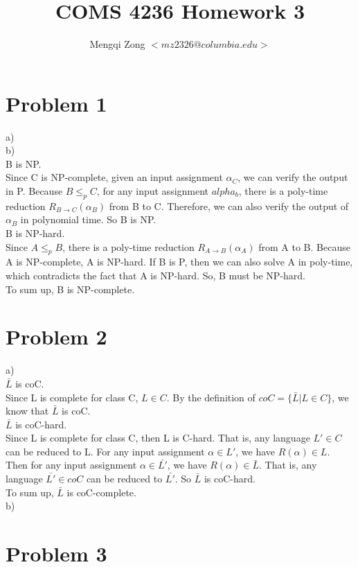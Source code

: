 \documentclass[12pt]{article}
\title{COMS 4236 Homework 3}
\author{Mengqi Zong $<mz2326@columbia.edu>$}
\begin{document}
\maketitle

\setlength{\parindent}{0in}

\section*{Problem 1}

a) \\



b) \\

B is NP. \\

Since C is NP-complete, given an input assignment $\alpha_C$, we can
verify the output in P. Because $B \le_p C$, for any input assignment
$alpha_b$, there is a poly-time reduction $R_{B \to C}(\alpha_B)$ from B to
C. Therefore, we can also verify the output of $\alpha_B$ in
polynomial time. So B is NP. \\

B is NP-hard. \\

Since $A \le_p B$, there is a poly-time reduction $R_{A \to
  B}(\alpha_A)$ from A to B. Because A is NP-complete, A is
NP-hard. If B is P, then we can also solve A in poly-time, which 
contradicts the fact that A is NP-hard. So, B must be NP-hard. \\

To sum up, B is NP-complete.

\section*{Problem 2}

a) \\

$\bar {L}$ is coC. \\

Since L is complete for class C, $L \in C$. By the definition of $coC
= \{ \bar {L} | L \in C \}$, we know that $\bar {L}$ is coC. \\

$\bar {L}$ is coC-hard. \\

Since L is complete for class C, then L is C-hard. That is, any
language $L' \in C$ can be reduced to L. For any input assignment
$\alpha \in L'$, we have $R(\alpha) \in L$. Then for any input
assignment $\alpha \in \bar {L'}$, we have $R(\alpha) \in \bar
{L}$. That is, any language $\bar {L'} \in coC$ can be reduced to $\bar
{L'}$. So $\bar {L}$ is coC-hard. \\ 

To sum up, $\bar {L}$ is coC-complete. \\

b) \\





\section*{Problem 3}
\end{document}
